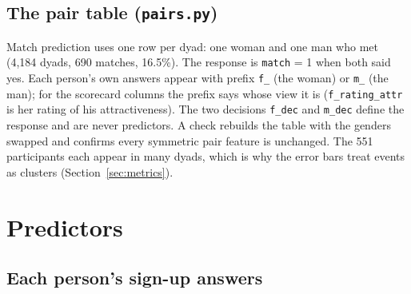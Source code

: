 \documentclass[11pt]{article}
\begin{document}
\subsection{The pair table (\texttt{pairs.py})}

Match prediction uses one row per dyad: one woman and one man who met (4,184 dyads, 690 matches, 16.5\%). The response is \texttt{match} = 1 when both said yes. Each person's own answers appear with prefix \texttt{f\_} (the woman) or \texttt{m\_} (the man); for the scorecard columns the prefix says whose view it is (\texttt{f\_rating\_attr} is her rating of his attractiveness). The two decisions \texttt{f\_dec} and \texttt{m\_dec} define the response and are never predictors. A check rebuilds the table with the genders swapped and confirms every symmetric pair feature is unchanged. The 551 participants each appear in many dyads, which is why the error bars treat events as clusters (Section~\ref{sec:metrics}).

\section{Predictors}\label{sec:predictors}

\subsection{Each person's sign-up answers}
\end{document}
